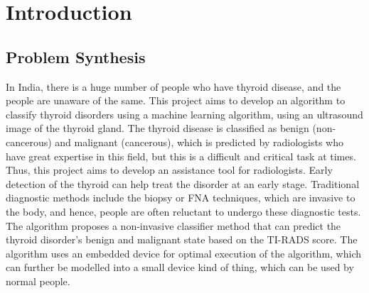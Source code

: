 
\setlength{\parindent}{2em}
\chapter{Introduction}
\section{Problem Synthesis}
\justifying
    \noindent
    In India, there is a huge number of people who have thyroid disease, and the people are unaware of the same. This project aims to develop an algorithm to classify thyroid disorders using a machine learning algorithm, using an ultrasound image of the thyroid gland. The thyroid disease is classified as benign (non-cancerous) and malignant (cancerous), which is predicted by radiologists who have great expertise in this field, but this is a difficult and critical task at times. Thus, this project aims to develop an assistance tool for radiologists. Early detection of the thyroid can help treat the disorder at an early stage. Traditional diagnostic methods include the biopsy or FNA techniques, which are invasive to the body, and hence, people are often reluctant to undergo these diagnostic tests. The algorithm proposes a non-invasive classifier method that can predict the thyroid disorder's benign and malignant state based on the TI-RADS score. The algorithm uses an embedded device for optimal execution of the algorithm, which can further be modelled into a small device kind of thing, which can be used by normal people. 
